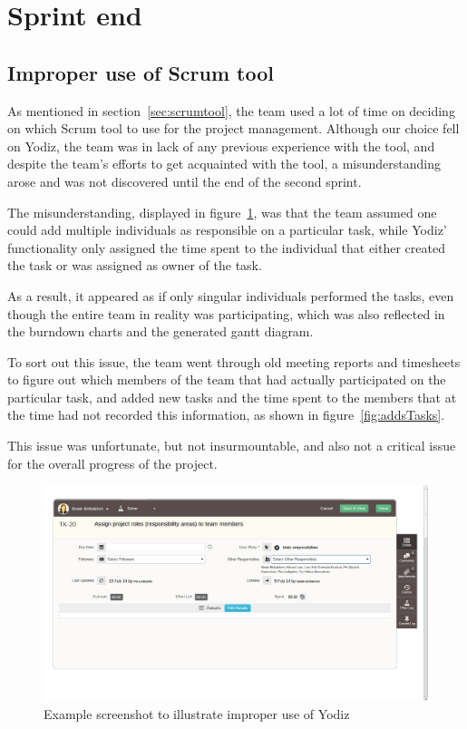 \section{Sprint end}

\subsection{Improper use of Scrum tool}
\label{sec:improperScrum}
As mentioned in section~\ref{sec:scrumtool}, the team used a lot of time on
deciding on which Scrum tool to use for the project management. Although our
choice fell on Yodiz, the team was in lack of any previous experience with the
tool, and despite the team's efforts to get acquainted with the tool, a
misunderstanding arose and was not discovered until the end of the second
sprint.

The misunderstanding, displayed in figure~\ref{fig:wrongUse}, was that the team
assumed one could add multiple individuals as responsible on a particular task,
while Yodiz' functionality only assigned the time spent to the individual that
either created the task or was assigned as owner of the task.

As a result, it appeared as if only singular individuals performed the tasks,
even though the entire team in reality was participating, which was also
reflected in the burndown charts and the generated gantt diagram. 

To sort out this issue, the team went through old meeting reports and timesheets
to figure out which members of the team that had actually participated on the
particular task, and added new tasks and the time spent to the members that at
the time had not recorded this information, as shown in
figure~\ref{fig:addsTasks}.

This issue was unfortunate, but not insurmountable, and also not a critical
issue for the overall progress of the project.

\begin{figure}[H]
\includegraphics[width=\textwidth]{ch/devProcess/fig/wrongUse.png}
\caption{Example screenshot to illustrate improper use of Yodiz}
\label{fig:wrongUse}
\end{figure}

